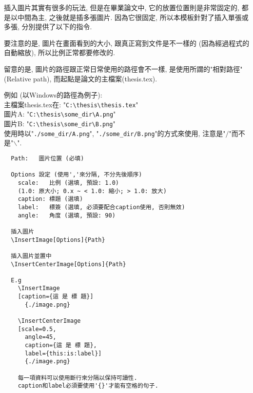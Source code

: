 

插入圖片其實有很多的玩法, 但是在畢業論文中, 它的放置位置則是非常固定的, 都是以中間為主, 之後就是插多張圖片. 因為它很固定, 所以本模板針對了插入單張或多張, 分別提供了以下的指令.

要注意的是, 圖片在畫面看到的大小, 跟真正寫到文件是不一樣的 (因為經過程式的自動縮放), 所以比例正常都要修改的.

留意的是, 圖片的路徑跟正常日常使用的路徑會不一樣, 是使用所謂的"相對路徑" (Relative path), 而起點是論文的主檔案(thesis.tex).

\noindent 例如 (以Windows的路徑為例子):\\
主檔案thesis.tex在: "\verb|C:\thesis\thesis.tex|"\\
圖片A: "\verb|C:\thesis\some_dir\A.png|"\\
圖片B: "\verb|C:\thesis\some_dir\B.png|"\\
使用時以"\verb|./some_dir/A.png|", "\verb|./some_dir/B.png|"的方式來使用, 注意是"$/$"而不是"$\backslash$".

\newpage
{}

  \begin{framed}
  \begin{verbatim}
  Path:   圖片位置 (必填)

  Options 設定 (使用','來分隔, 不分先後順序)
    scale:   比例 (選填, 預設: 1.0)
    (1.0: 原大小; 0.x ~ < 1.0: 縮小; > 1.0: 放大)
    caption: 標題 (選填)
    label:   標簽 (選填, 必須要配合caption使用, 否則無效)
    angle:   角度 (選填, 預設: 90)

  插入圖片
  \InsertImage[Options]{Path}

  插入圖片並置中
  \InsertCenterImage[Options]{Path}

  E.g
    \InsertImage
    [caption={這 是 標 題}]
      {./image.png}

    \InsertCenterImage
    [scale=0.5,
      angle=45,
      caption={這 是 標 題},
      label={this:is:label}]
      {./image.png}

    每一項資料可以使用斷行來分隔以保持可讀性.
    caption和label必須要使用'{}'才能有空格的句子.
  \end{verbatim}
  \end{framed}

